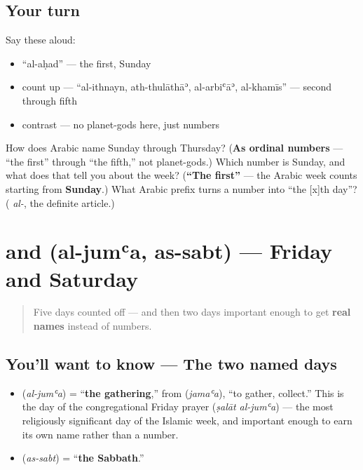 \subsection*{Your turn}
Say these aloud:

\begin{itemize}
\raggedright
  \item \textquotedblleft{}al-aḥad\textquotedblright{} — the first, Sunday
  \item count up — \textquotedblleft{}al-ithnayn, ath-thulāthāʾ, al-arbiʿāʾ, al-khamīs\textquotedblright{} — second through fifth
  \item contrast — no planet-gods here, just numbers
\end{itemize}

\begin{tcolorbox}[breakable,colback=teal!4,colframe=teal!35!black,title={Before you move on}]
How does Arabic name Sunday through Thursday? (\textbf{As ordinal numbers} — \textquotedblleft{}the first\textquotedblright{} through \textquotedblleft{}the fifth,\textquotedblright{} not planet-gods.) Which number is Sunday, and what does that tell you about the week? (\textbf{\textquotedblleft{}The first\textquotedblright{}} — the Arabic week counts starting from \textbf{Sunday}.) What Arabic prefix turns a number into \textquotedblleft{}the {[}x{]}th day\textquotedblright{}? (\textbf{} \emph{al-}, the definite article.)
\end{tcolorbox}
\section[\texorpdfstring{\ar{الجمعة} \ar{السبت} (al-jumʿa as-sabt)}{الجمعة السبت (al-jumʿa as-sabt)}]{ and  (al-jumʿa, as-sabt) — Friday and Saturday}

\label{lesson:AR-C08-al-jumua-as-sabt}



\begin{quote}
Five days counted off — and then two days important enough to get \textbf{real names} instead of numbers.
\end{quote}

\subsection*{You'll want to know — The two named days}
\begin{itemize}
\raggedright
  \item \textbf{} (\emph{al-jumʿa}) = \textquotedblleft{}\textbf{the gathering},\textquotedblright{} from \textbf{} (\emph{jamaʿa}), \textquotedblleft{}to gather, collect.\textquotedblright{} This is the day of the congregational Friday prayer (\emph{ṣalāt al-jumʿa}) — the most religiously significant day of the Islamic week, and important enough to earn its own name rather than a number.
  \item \textbf{} (\emph{as-sabt}) = \textquotedblleft{}\textbf{the Sabbath}.\textquotedblright{}
\end{itemize}

